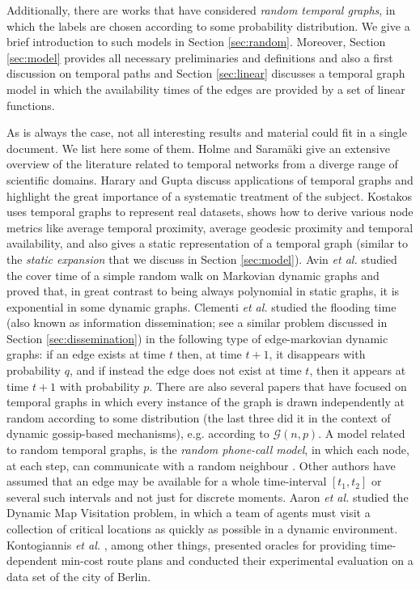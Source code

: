 \documentclass[oribibl, 11pt]{llncs}
\newcommand{\cg}{\mathcal{G}}
\begin{document}
Additionally, there are works that have considered \emph{random temporal graphs}, in which the labels are chosen according to some probability distribution. We give a brief introduction to such models in Section \ref{sec:random}. Moreover, Section \ref{sec:model} provides all necessary preliminaries and definitions and also a first discussion on temporal paths and Section \ref{sec:linear} discusses a temporal graph model in which the availability times of the edges are provided by a set of linear functions.

As is always the case, not all interesting results and material could fit in a single document. We list here some of them. Holme and Saram{\" a}ki \cite{HS12} give an extensive overview of the literature related to temporal networks from a diverge range of scientific domains. Harary and Gupta \cite{HG97} discuss applications of temporal graphs and highlight the great importance of a systematic treatment of the subject. Kostakos \cite{Ko09} uses temporal graphs to represent real datasets, shows how to derive various node metrics like average temporal proximity, average geodesic proximity and temporal availability, and also gives a static representation of a temporal graph (similar to the \emph{static expansion} that we discuss in Section \ref{sec:model}). Avin \emph{et al.} \cite{AKL08} studied the cover time of a simple random walk on Markovian dynamic graphs and proved that, in great contrast to being always polynomial in static graphs, it is exponential in some dynamic graphs. Clementi \emph{et al.} \cite{CFTE08} studied the flooding time (also known as information dissemination; see a similar problem discussed in Section \ref{sec:dissemination}) in the following type of edge-markovian dynamic graphs: if an edge exists at time $t$ then, at time $t + 1$, it disappears with probability $q$, and if instead the edge does not exist at time $t$, then it appears at time $t + 1$ with probability $p$. There are also several papers that have focused on temporal graphs in which every instance of the graph is drawn independently at random according to some distribution \cite{CPMS07,HHL88,Pi87,KK02} (the last three did it in the context of dynamic gossip-based mechanisms), e.g. according to $\cg(n,p)$. A model related to random temporal graphs, is the \emph{random phone-call model}, in which each node, at each step, can communicate with a random neighbour \cite{DGH87,KSSV00}. Other authors \cite{XFJ03,FT98} have assumed that an edge may be available for a whole time-interval $[t_1,t_2]$ or several such intervals and not just for discrete moments. Aaron \emph{et al.} \cite{AKM14} studied the {\sc Dynamic Map Visitation} problem, in which a team of agents must visit a collection of critical locations as quickly as possible in a dynamic environment. Kontogiannis \emph{et al.} \cite{KMP15}, among other things, presented oracles for providing time-dependent min-cost route plans and conducted their experimental evaluation on a data set of the city of Berlin. 
\end{document}
